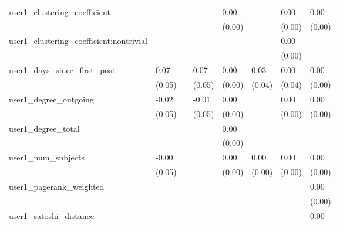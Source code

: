 \begin{table}
\begin{center}
\begin{tabular}{llllllll}
user1_clustering_coefficient                   &          &            &         & 0.00    &          & 0.00               & 0.00     \\
                                               &          &            &         & (0.00)  &          & (0.00)             & (0.00)   \\
user1_clustering_coefficient:nontrivial        &          &            &         &         &          & 0.00               &          \\
                                               &          &            &         &         &          & (0.00)             &          \\
user1_days_since_first_post                    & 0.07     &            & 0.07    & 0.00    & 0.03     & 0.00               & 0.00     \\
                                               & (0.05)   &            & (0.05)  & (0.00)  & (0.04)   & (0.04)             & (0.00)   \\
user1_degree_outgoing                          & -0.02    &            & -0.01   & 0.00    &          & 0.00               & 0.00     \\
                                               & (0.05)   &            & (0.05)  & (0.00)  &          & (0.00)             & (0.00)   \\
user1_degree_total                             &          &            &         & 0.00    &          &                    &          \\
                                               &          &            &         & (0.00)  &          &                    &          \\
user1_num_subjects                             & -0.00    &            &         & 0.00    & 0.00     & 0.00               & 0.00     \\
                                               & (0.05)   &            &         & (0.00)  & (0.00)   & (0.00)             & (0.00)   \\
user1_pagerank_weighted                        &          &            &         &         &          &                    & 0.00     \\
                                               &          &            &         &         &          &                    & (0.00)   \\
user1_satoshi_distance                         &          &            &         &         &          &                    & 0.00     \\

\end{tabular}
\end{center}
\end{table}
